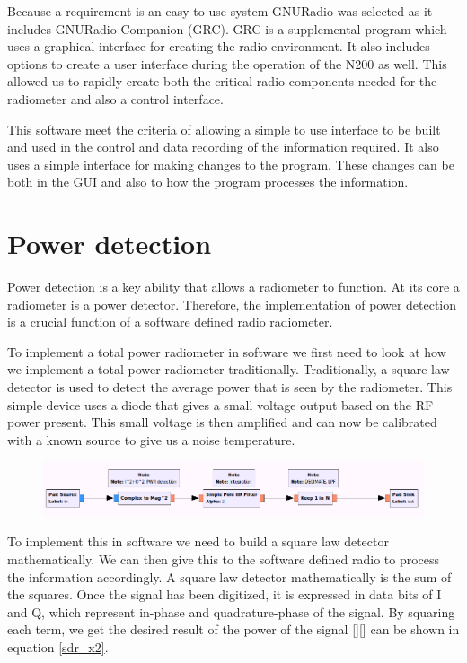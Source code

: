 Because a requirement is an easy to use system GNURadio was selected as it includes GNURadio Companion (GRC). GRC is a supplemental program which uses a graphical interface for creating the radio environment.  It also includes options to create a user interface during the operation of the N200 as well.  This allowed us to rapidly create both the critical radio components needed for the radiometer and also a control interface.

This software meet the criteria of allowing a simple to use interface to be built and used in the control and data recording of the information required.  It also uses a simple interface for making changes to the program.  These changes can be both in the GUI and also to how the program processes the information.

\section{Power detection}
Power detection is a key ability that allows a radiometer to function.  At its core a radiometer is a power detector.  Therefore, the implementation of power detection is a crucial function of a software defined radio radiometer.

To implement a total power radiometer in software we first need to look at how we implement a total power radiometer traditionally.  Traditionally, a square law detector is used to detect the average power that is seen by the radiometer.  This simple device uses a diode that gives a small voltage output based on the RF power present.  This small voltage is then amplified and can now be calibrated with a known source to give us a noise temperature.  

{\begin{figure}[h!tb] 
\centering
\includegraphics[width=17cm]{Images/TPR_grc.png}
\label{square_block}
\end{figure}
}

To implement this in software we need to build a square law detector mathematically.  We can then give this to the software defined radio to process the information accordingly.  A square law detector mathematically is the sum of the squares.  Once the signal has been digitized, it is expressed in data bits of I and Q, which represent in-phase and quadrature-phase of the signal.  By squaring each term, we get the desired result of the power of the signal [\cite{Sarijari}][\cite{Rashid}] can be shown in equation \ref{sdr_x2}.

